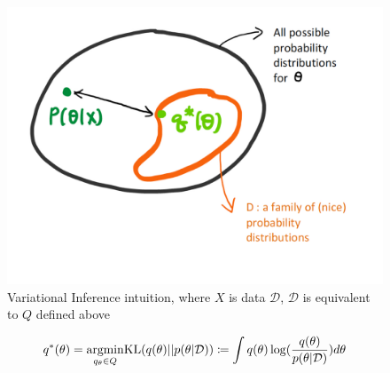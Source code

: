  \begin{figure}[H]
 	\center
 	\includegraphics[scale = 0.2]{VIoptimization}
 	\caption{Variational Inference intuition, where $X$ is data $\mathcal{D}$, $\mathcal{D}$ is equivalent to $Q$ defined above}
 	\label{fig:VIoptimization}
 \end{figure}

\begin{equation}
	\label{eq:VI1}
	q^{*}(\theta) = \underset{q_{\theta} \in Q}{\operatorname{argmin}} \textnormal{KL}(q(\theta)||p(\theta|\mathcal{D})) \coloneqq \int q(\theta)\log(\frac{q(\theta)}{p(\theta|\mathcal{D})})d\theta
\end{equation}

